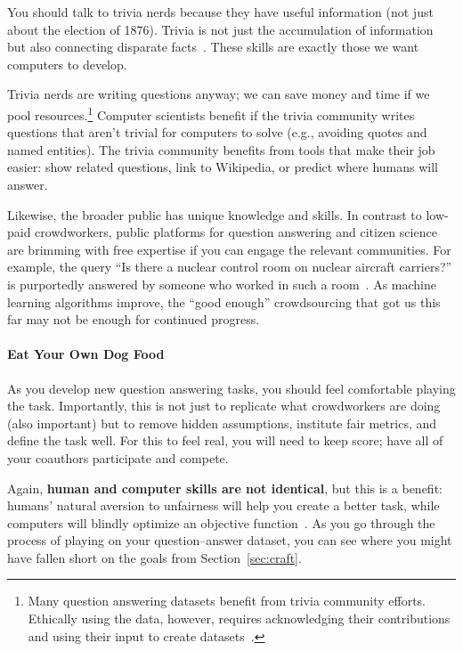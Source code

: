 You should talk to trivia nerds because they have useful information (not just about the election of 1876).
Trivia is not just the accumulation of information but also connecting disparate facts~\cite{jennings-06}.
These skills are exactly those we want computers to develop.

Trivia nerds are writing questions anyway; we can save money and time
if we pool resources.\footnote{Many question answering datasets
  benefit from trivia community efforts.
Ethically using the data, however, requires acknowledging their
contributions and using their input to create datasets~\cite[Consent
  and Inclusivity]{jo-20}.}
Computer scientists benefit if the trivia community writes questions
that aren't trivial for computers to solve (e.g., avoiding quotes and
named entities).
The trivia community benefits from tools that make their job easier:
show related questions, link to Wikipedia, or predict where humans
will answer.

Likewise, the broader public has unique knowledge and skills.
In contrast to low-paid crowdworkers, public platforms for question
answering and citizen science~\cite{bowser-13} are brimming with free
expertise if you can engage the relevant communities.
For example, the  query ``Is there a nuclear control room
on nuclear aircraft carriers?'' is purportedly answered by someone who
worked in such a room~\cite{humphries-17}.
As machine learning algorithms improve, the ``good enough''
crowdsourcing that got us this far may not be enough for
continued progress.

\paragraph{Eat Your Own Dog Food}

As you develop new question answering tasks, you should feel comfortable playing the task.
Importantly, this is not just to replicate what crowdworkers are doing (also important) but to remove hidden assumptions, institute fair metrics, and define the task well.
For this to feel real, you will need to keep score; have all of your coauthors participate and compete.

Again, {\bf human and computer skills are not
  identical}, but this is a benefit: humans' natural aversion to
unfairness will help you create a better task, while computers will
blindly optimize an objective function~\cite{bostrom-03}.
As you go through the process of playing on your question--answer dataset, you can see where you might have fallen short on the goals from Section~\ref{sec:craft}.

